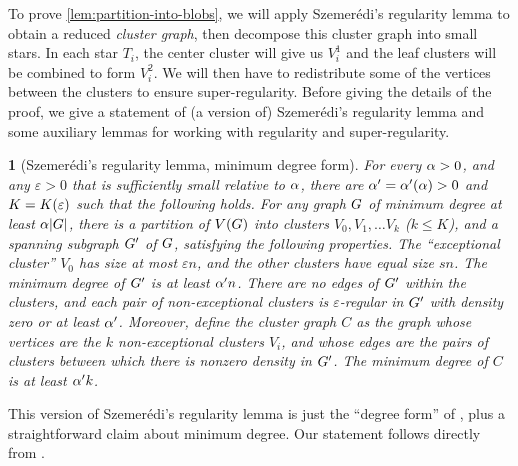 \documentclass[11pt,english]{article}
\theoremstyle{plain}
\theoremstyle{plain}
\theoremstyle{plain}
\newtheorem{lem}[thm]{\protect\lemmaname}
\theoremstyle{plain}
\theoremstyle{plain}
\theoremstyle{definition}
\theoremstyle{definition}
\theoremstyle{remark}
\theoremstyle{remark}
\theoremstyle{plain}
\theoremstyle{definition}
\theoremstyle{definition}
\theoremstyle{plain}
\theoremstyle{plain}
\theoremstyle{plain}
\newtheorem{mylem}[mythm]{\protect\lemmaname}
\renewenvironment{lem}{\begin{mylem}}{\end{mylem}}
\theoremstyle{plain}
\theoremstyle{remark}
\theoremstyle{plain}
\theoremstyle{definition}
\let\originalleft\left
\let\originalright\right
\renewcommand{\left}{\mathopen{}\mathclose\bgroup\originalleft}
\renewcommand{\right}{\aftergroup\egroup\originalright}
\providecommand{\lemmaname}{Lemma}
\begin{document}
To prove \ref{lem:partition-into-blobs}, we will apply Szemer\'edi's
regularity lemma to obtain a reduced \emph{cluster graph}, then decompose
this cluster graph into small stars. In each star $T_{i}$, the center
cluster will give us $V_{i}^{1}$ and the leaf clusters will be combined
to form $V_{i}^{2}$. We will then have to redistribute some of the
vertices between the clusters to ensure super-regularity. Before giving
the details of the proof, we give a statement of (a version of) Szemer\'edi's
regularity lemma and some auxiliary lemmas for working with regularity
and super-regularity.
\begin{lem}[Szemer\'edi's regularity lemma, minimum degree form]
\label{lem:szemeredi-regularity}For every $\alpha>0$, and any $\varepsilon>0$
that is sufficiently small relative to $\alpha$, there are $\a'=\a'\left(\a\right)>0$
and $K=K\left(\varepsilon\right)$ such that the following holds.
For any graph $G$ of minimum degree at least $\a\left|\G\right|$,
there is a partition of $V\left(\G\right)$ into clusters $V_{0},V_{1},\dots V_{k}$
($k\le K$), and a spanning subgraph $G'$ of $G$, satisfying the
following properties. The ``exceptional cluster'' $V_{0}$ has size
at most $\varepsilon n$, and the other clusters have equal size $sn$.
The minimum degree of $G'$ is at least $\alpha'n$. There are no edges
of $G'$ within the clusters, and each pair of non-exceptional clusters
is $\varepsilon$-regular in $G'$ with density zero or at least
$\alpha'$. Moreover, define the \emph{cluster graph} $C$ as the graph
whose vertices are the $k$ non-exceptional clusters $V_{i}$, and
whose edges are the pairs of clusters between which there is nonzero
density in $G'$. The minimum degree of $C$ is at least $\alpha'k$.
\end{lem}
This version of Szemer\'edi's regularity lemma is just the ``degree
form'' of \cite[Theorem~1.10]{KS96}, plus a straightforward claim
about minimum degree. Our statement follows directly from \cite[Proposition~9]{KOT05}.
\end{document}
